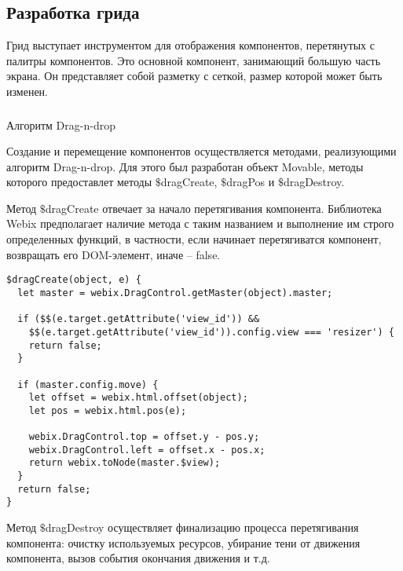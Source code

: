 \subsection{Разработка грида}
\label{sec:development:grid}

Грид выступает инструментом для отображения компонентов, перетянутых с палитры компонентов. Это основной компонент, занимающий большую часть экрана. Он представляет собой разметку с сеткой, размер которой может быть изменен.

\subsubsection{}Алгоритм Drag-n-drop
\

Создание и перемещение компонентов осуществляется методами, реализующими алгоритм Drag-n-drop. Для этого был разработан объект Movable, методы которого предоставлет методы $\$$dragCreate, $\$$dragPos и $\$$dragDestroy.

Метод $\$$dragCreate отвечает за начало перетягивания компонента. Библиотека Webix предполагает наличие метода с таким названием и выполнение им строго определенных функций, в частности, если начинает перетягиватся компонент, возвращать его DOM-элемент, иначе -- false.

\begin{lstlisting}
$dragCreate(object, e) {
  let master = webix.DragControl.getMaster(object).master;

  if ($$(e.target.getAttribute('view_id')) &&
    $$(e.target.getAttribute('view_id')).config.view === 'resizer') {
    return false;
  }

  if (master.config.move) {
    let offset = webix.html.offset(object);
    let pos = webix.html.pos(e);

    webix.DragControl.top = offset.y - pos.y;
    webix.DragControl.left = offset.x - pos.x;
    return webix.toNode(master.$view);
  }
  return false;
}
\end{lstlisting}

Метод $\$$dragDestroy осуществляет финализацию процесса перетягивания компонента: очистку используемых ресурсов, убирание тени от движения компонента, вызов события окончания движения и т.д.


